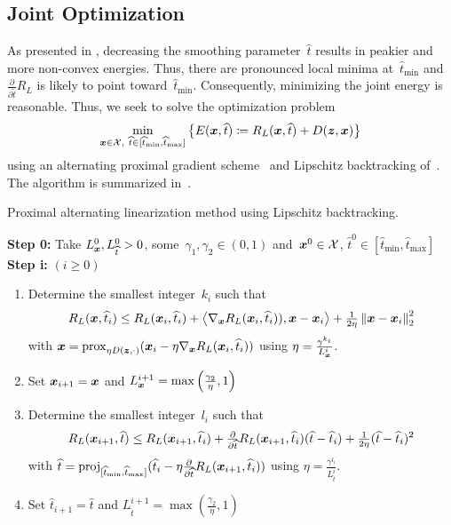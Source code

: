 \documentclass{article} %
\theoremstyle{plain}
\theoremstyle{definition}
\theoremstyle{remark}
\newcommand{\X}{\mathcal{X}}
\newcommand{\norm}[1]{\left\Vert#1\right\Vert}
\newcommand{\scal}[2]{\left\langle#1,#2\right\rangle}
\newcommand{\prox}{\mathrm{prox}}
\newcommand{\proj}{\mathrm{proj}}
\def\hatt{{\widehat{t}}}
\newcommand{\tminh}{\hatt_\mathrm{min}}
\newcommand{\tmaxh}{\hatt_\mathrm{max}}
\begin{document}
\subsection{Joint Optimization}
As presented in , decreasing the smoothing parameter~$\widehat{t}$ results in peakier and more non-convex energies.
Thus, there are pronounced local minima at~$\tminh$ and $\frac{\partial}{\partial\widetilde{t}}R_L$ is likely to point toward~$\tminh$.
Consequently, minimizing the joint energy is reasonable.
Thus, we seek to solve the optimization problem
\begin{align} \label{eq:jointEnergy}
\min_{\vx\in\X,\ \widehat{t}\in[\tminh,\tmaxh]} \left\{E(\vx,\widehat{t})\coloneqq R_L(\vx,\widehat{t}) + D(\vz,\vx)\right\}
\end{align}
using an alternating proximal gradient scheme~\citep{BoSa14} and Lipschitz backtracking of~\citet{BeTe09}.
The algorithm is summarized in~.

\begin{algorithm}[t]
\caption{Proximal alternating linearization method using Lipschitz backtracking.}\label{alg:jointMinimization}
\textbf{Step 0:} Take $L_\vx^0,L_\hatt^0>0$, some~$\gamma_1,\gamma_2\in(0,1)$ and~$\vx^0\in\X$, $\hatt^0\in[\tminh,\tmaxh]$\\
\textbf{Step i:} $(i\geq 0)$ 
\begin{enumerate}
\item
Determine the smallest integer~$k_i$ such that 
\[
R_L(\vx,\hatt_i) \leq R_L(\vx_i,\hatt_i) + \scal{\nabla_\vx R_L(\vx_i,\hatt_i))}{\vx-\vx_i} + \tfrac{1}{2\eta}\norm{\vx-\vx_i}_2^2
\]
with $\vx = \prox_{\eta D(\vz,\cdot)}(\vx_i-\eta\nabla_\vx R_L(\vx_i,\hatt_i))$ using $\eta=\tfrac{\gamma^{k_i}}{L_{\bm{x}}^i}$.
\item
Set ${\bm{x}}_{i+1}={\bm{x}}$ and $L_{\bm{x}}^{i+1}=\max\left(\tfrac{\gamma_2}{\eta},1\right)$
\item
Determine the smallest integer~$l_i$ such that 
\[
R_L(\vx_{i+1},\hatt) \leq R_L(\vx_{i+1},\hatt_i) + \tfrac{\partial}{\partial\hatt} R_L(\vx_{i+1},\hatt_i)(\hatt-\hatt_i) + \tfrac{1}{2\eta}(\hatt-\hatt_i)^2
\]
with $\hatt = \proj_{[\tminh,\tmaxh]}(\hatt_i-\eta\tfrac{\partial}{\partial\hatt}R_L(\vx_{i+1},\hatt_i))$ using $\eta=\tfrac{\gamma^{l_i}}{L_\hatt^i}$.
\item
Set $\hatt_{i+1}=\hatt$ and $L_\hatt^{i+1}=\max\left(\tfrac{\gamma_2}{\eta},1\right)$
\end{enumerate}
\end{algorithm}
\end{document}
